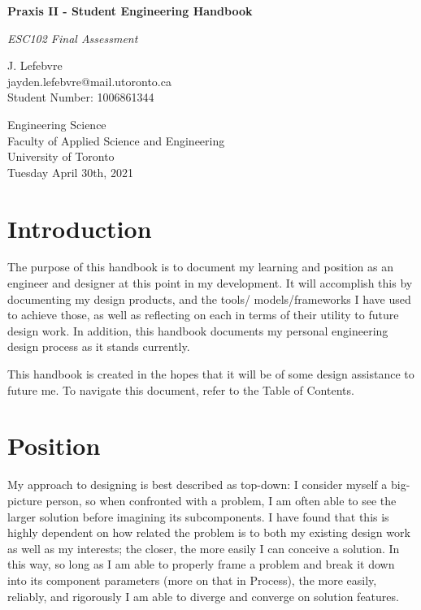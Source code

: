 \documentclass{report}
\begin{document}
\begin{titlepage}
    \begin{center}
    \vspace*{1cm}

    \textbf{Praxis II - Student Engineering Handbook}

    \vspace{0.5cm}
    \textit{ESC102 Final Assessment}

    \vspace{1.5cm}

    J. Lefebvre\\\small{jayden.lefebvre@mail.utoronto.ca}\\\small{Student Number: 1006861344}

    \vfill

    \vspace{0.8cm}

    Engineering Science\\
    Faculty of Applied Science and Engineering\\
    University of Toronto\\
    Tuesday April 30th, 2021

    \end{center}
\end{titlepage}

\tableofcontents
\pagebreak

\section{Introduction}
The purpose of this handbook is to document my learning and position 
as an engineer and designer at this point in my development. It will 
accomplish this by documenting my design products, and the tools/
models/frameworks I have used to achieve those, as well as reflecting 
on each in terms of their utility to future design work. In addition, 
this handbook documents my personal engineering design process as it 
stands currently.

This handbook is created in the hopes that it will be of some design 
assistance to future me. To navigate this document, refer to the Table 
of Contents.
\section{Position}
My approach to designing is best described as top-down: I consider 
myself a big-picture person, so when confronted with a problem, I am 
often able to see the larger solution before imagining its subcomponents. 
I have found that this is highly dependent on how related the problem 
is to both my existing design work as well as my interests; the closer, 
the more easily I can conceive a solution. In this way, so long as I am 
able to properly frame a problem and break it down into its component 
parameters (more on that in Process), the more easily, reliably, and 
rigorously I am able to diverge and converge on solution features.
\end{document}
